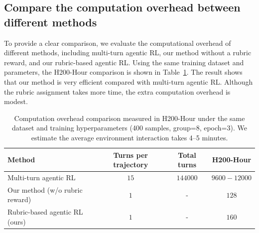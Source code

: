 \subsection{Compare the computation overhead between different methods}
To provide a clear comparison, we evaluate the computational overhead of different methods, including multi-turn agentic RL, our method without a rubric reward, and our rubric-based agentic RL. Using the same training dataset and parameters, the H200-Hour comparison is shown in Table~\ref {tab:h200_overhead}. The result shows that our method is very efficient compared with multi-turn agentic RL. Although the rubric assignment takes more time, the extra computation overhead is modest. 
\begin{table}[t]
\centering
\small
\setlength{\tabcolsep}{6pt}
\begin{tabular}{lccc}
\toprule
Method & Turns per trajectory & Total turns & H200-Hour \\
\midrule
Multi-turn agentic RL & $15$ &
$144000$ &
$9600-12000$ \\
\addlinespace
Our method (w/o rubric reward) & $1$ &
- &
$128$ \\
\addlinespace
Rubric-based agentic RL (ours) & $1$ &
- &
$160$ \\
\bottomrule
\end{tabular}
\vspace{2pt}
\caption{Computation overhead comparison measured in H200-Hour under the same dataset and training hyperparameters (400 samples, group=8, epoch=3).
We estimate the average environment interaction takes 4--5 minutes.}
\label{tab:h200_overhead}
\vspace{-6pt}
\begin{flushleft}
\end{flushleft}
\end{table}




